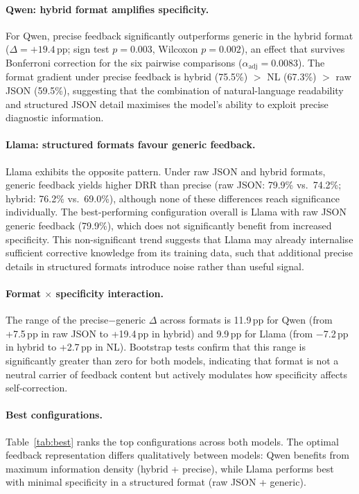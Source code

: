 \paragraph{Qwen: hybrid format amplifies specificity.}
For Qwen, precise feedback significantly outperforms generic in the hybrid format ($\Delta = +19.4$\,pp; sign test $p = 0.003$, Wilcoxon $p = 0.002$), an effect that survives Bonferroni correction for the six pairwise comparisons ($\alpha_\text{adj} = 0.0083$). The format gradient under precise feedback is hybrid (75.5\%) $>$ NL (67.3\%) $>$ raw JSON (59.5\%), suggesting that the combination of natural-language readability and structured JSON detail maximises the model's ability to exploit precise diagnostic information.

\paragraph{Llama: structured formats favour generic feedback.}
Llama exhibits the opposite pattern. Under raw JSON and hybrid formats, generic feedback yields higher DRR than precise (raw JSON: 79.9\% vs.\ 74.2\%; hybrid: 76.2\% vs.\ 69.0\%), although none of these differences reach significance individually. The best-performing configuration overall is Llama with raw JSON generic feedback (79.9\%), which does not significantly benefit from increased specificity. This non-significant trend suggests that Llama may already internalise sufficient corrective knowledge from its training data, such that additional precise details in structured formats introduce noise rather than useful signal.

\paragraph{Format $\times$ specificity interaction.}
The range of the precise$-$generic $\Delta$ across formats is 11.9\,pp for Qwen (from +7.5\,pp in raw JSON to +19.4\,pp in hybrid) and 9.9\,pp for Llama (from $-$7.2\,pp in hybrid to +2.7\,pp in NL). Bootstrap tests confirm that this range is significantly greater than zero for both models, indicating that format is not a neutral carrier of feedback content but actively modulates how specificity affects self-correction.

\paragraph{Best configurations.}
Table~\ref{tab:best} ranks the top configurations across both models. The optimal feedback representation differs qualitatively between models: Qwen benefits from maximum information density (hybrid + precise), while Llama performs best with minimal specificity in a structured format (raw JSON + generic).


